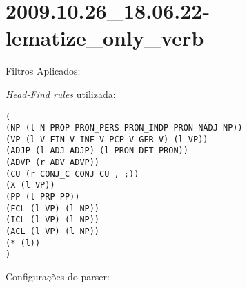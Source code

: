 \section{2009.10.26_18.06.22-lematize_only_verb} %
\label{sec:exp:2009.10.26_18.06.22-lematize_only_verb}

Filtros Aplicados:

\begin{itemize}
  
  \item{\emph{LematizeOnlyVerb}
  
\end{itemize}

\emph{Head-Find rules} utilizada:

\scriptsize
\begin{verbatim}
(
(NP (l N PROP PRON_PERS PRON_INDP PRON NADJ NP))
(VP (l V_FIN V_INF V_PCP V_GER V) (l VP))
(ADJP (l ADJ ADJP) (l PRON_DET PRON))
(ADVP (r ADV ADVP))
(CU (r CONJ_C CONJ CU , ;))
(X (l VP))
(PP (l PRP PP))
(FCL (l VP) (l NP))
(ICL (l VP) (l NP))
(ACL (l VP) (l NP))
(* (l))
)

\end{verbatim}

\normalsize

Configurações do parser:

